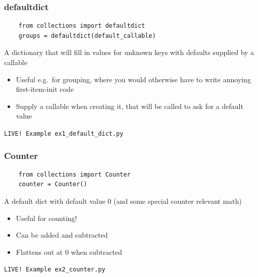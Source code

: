 \documentclass{beamer}
\begin{document}
\begin{frame}[fragile]
  \frametitle{defaultdict}
  \begin{verbatim}
    from collections import defaultdict
    groups = defaultdict(default_callable)
  \end{verbatim}
  \begin{block}{\vspace*{-3ex}}
    A dictionary that will fill in values for unknown keys with
    defaults supplied by a callable
  \end{block}
  \begin{itemize}
  \item Useful e.g.\ for grouping, where you would otherwise have to
    write annoying first-item-init code
  \item Supply a callable when creating it, that will be called to ask
    for a default value
  \end{itemize}
  \begin{center}
    \texttt{LIVE! Example ex1\_default\_dict.py}
  \end{center}
\end{frame}

\begin{frame}[fragile]
  \frametitle{Counter}
  \begin{verbatim}
    from collections import Counter
    counter = Counter()
  \end{verbatim}
  \begin{block}{\vspace*{-3ex}}
    A default dict with default value 0 (and some special counter
    relevant math)
  \end{block}
  \begin{itemize}
  \item Useful for counting!
  \item Can be added and subtracted
  \item Flattens out at 0 when subtracted
  \end{itemize}
  \begin{center}
    \texttt{LIVE! Example ex2\_counter.py}
  \end{center}
\end{frame}
\end{document}
